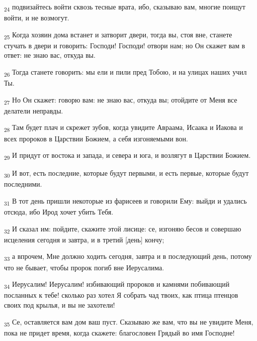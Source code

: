 \begin{tcolorbox}
\textsubscript{24} подвизайтесь войти сквозь тесные врата, ибо, сказываю вам, многие поищут войти, и не возмогут.
\end{tcolorbox}
\begin{tcolorbox}
\textsubscript{25} Когда хозяин дома встанет и затворит двери, тогда вы, стоя вне, станете стучать в двери и говорить: Господи! Господи! отвори нам; но Он скажет вам в ответ: не знаю вас, откуда вы.
\end{tcolorbox}
\begin{tcolorbox}
\textsubscript{26} Тогда станете говорить: мы ели и пили пред Тобою, и на улицах наших учил Ты.
\end{tcolorbox}
\begin{tcolorbox}
\textsubscript{27} Но Он скажет: говорю вам: не знаю вас, откуда вы; отойдите от Меня все делатели неправды.
\end{tcolorbox}
\begin{tcolorbox}
\textsubscript{28} Там будет плач и скрежет зубов, когда увидите Авраама, Исаака и Иакова и всех пророков в Царствии Божием, а себя изгоняемыми вон.
\end{tcolorbox}
\begin{tcolorbox}
\textsubscript{29} И придут от востока и запада, и севера и юга, и возлягут в Царствии Божием.
\end{tcolorbox}
\begin{tcolorbox}
\textsubscript{30} И вот, есть последние, которые будут первыми, и есть первые, которые будут последними.
\end{tcolorbox}
\begin{tcolorbox}
\textsubscript{31} В тот день пришли некоторые из фарисеев и говорили Ему: выйди и удались отсюда, ибо Ирод хочет убить Тебя.
\end{tcolorbox}
\begin{tcolorbox}
\textsubscript{32} И сказал им: пойдите, скажите этой лисице: се, изгоняю бесов и совершаю исцеления сегодня и завтра, и в третий [день] кончу;
\end{tcolorbox}
\begin{tcolorbox}
\textsubscript{33} а впрочем, Мне должно ходить сегодня, завтра и в последующий день, потому что не бывает, чтобы пророк погиб вне Иерусалима.
\end{tcolorbox}
\begin{tcolorbox}
\textsubscript{34} Иерусалим! Иерусалим! избивающий пророков и камнями побивающий посланных к тебе! сколько раз хотел Я собрать чад твоих, как птица птенцов своих под крылья, и вы не захотели!
\end{tcolorbox}
\begin{tcolorbox}
\textsubscript{35} Се, оставляется вам дом ваш пуст. Сказываю же вам, что вы не увидите Меня, пока не придет время, когда скажете: благословен Грядый во имя Господне!
\end{tcolorbox}
